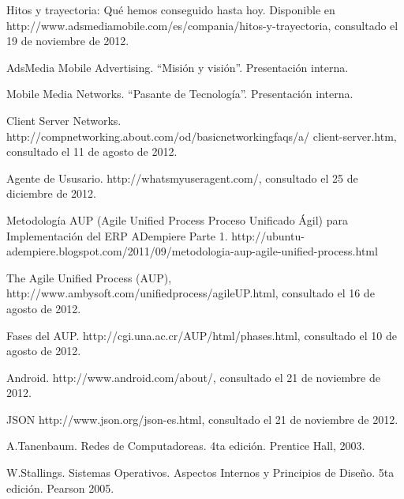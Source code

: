 \renewcommand{\bibname}{Referencias Bibliográficas}
\begin{thebibliography}{10}
Hitos y trayectoria: Qué hemos conseguido hasta
hoy. Disponible en http://www.adsmediamobile.com/es/compania/hitos-y-trayectoria,
consultado el 19 de noviembre de 2012.

AdsMedia Mobile Advertising. \textquotedblleft{}Misión
y visión\textquotedblright{}. Presentación interna.

Mobile Media Networks. \textquotedblleft{}Pasante
de Tecnología\textquotedblright{}. Presentación interna.

Client Server Networks. http://compnetworking.about.com/od/basicnetworkingfaqs/a/\newline
client-server.htm, consultado el 11 de agosto de 2012.

Agente de Ususario. http://whatsmyuseragent.com/,
consultado el 25 de diciembre de 2012.

Metodología AUP (Agile Unified Process \textendash{}
Proceso Unificado Ágil) para Implementación del ERP ADempiere \textendash{}
Parte 1. http://ubuntu-adempiere.blogspot.com/2011/09/metodologia-aup-agile-unified-process.html

The Agile Unified Process (AUP), http://www.ambysoft.com/unifiedprocess/agileUP.html,
consultado el 16 de agosto de 2012.

Fases del AUP. http://cgi.una.ac.cr/AUP/html/phases.html,
consultado el 10 de agosto de 2012.

Android. http://www.android.com/about/, consultado
el 21 de noviembre de 2012.


JSON http://www.json.org/json-es.html, consultado
el 21 de noviembre de 2012.

A.Tanenbaum. Redes de Computadoreas. 4ta edición.
Prentice Hall, 2003.

W.Stallings. Sistemas Operativos. Aspectos Internos
y Principios de Diseño. 5ta edición. Pearson 2005.


\end{thebibliography}
